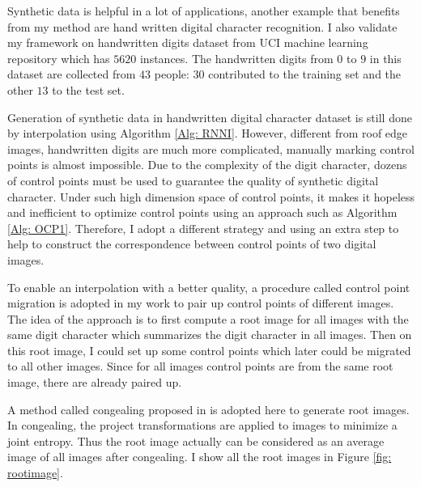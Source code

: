 \documentclass{iitthesis}
\begin{document}
 Synthetic data is helpful in a lot of applications, another example that benefits from my method are hand written digital character recognition. I also validate my framework on handwritten digits dataset from
UCI machine learning repository \cite{Bache+Lichman:2013} which has $5620$ instances. The handwritten digits from $0$ to $9$ in this dataset are collected from $43$ people: $30$ contributed to the training set and the other $13$ to the test set. 

Generation of synthetic data in handwritten digital character dataset is still done by interpolation using Algorithm \ref{Alg: RNNI}. However, different from roof edge images, handwritten digits are much more complicated, manually marking control points is almost impossible. Due to the complexity of the digit character, dozens of control points must be used to guarantee the quality of synthetic digital character. Under such high dimension space of control points, it makes it hopeless and inefficient to optimize control points using an approach such as Algorithm \ref{Alg: OCP1}. Therefore, I adopt a different strategy and using an extra step to help to construct the correspondence between control points of two digital images. 

To enable an interpolation with a better quality, a procedure called control point migration is adopted in my work to pair up control points of different images. The idea of the approach is to first compute a root image for all images with the same digit character which summarizes the digit character in all images. Then on this root image, I could set up some control points which later could be migrated to all other images. Since for all images control points are from the same root image, there are already paired up. 

A method called congealing proposed in \cite{ME:00} is adopted here to generate root images. In congealing, the project transformations are applied to images to minimize a joint entropy. Thus the root image actually can be considered as an average image of all images after congealing. I show all the root images in Figure \ref{fig: rootimage}.
\end{document}
